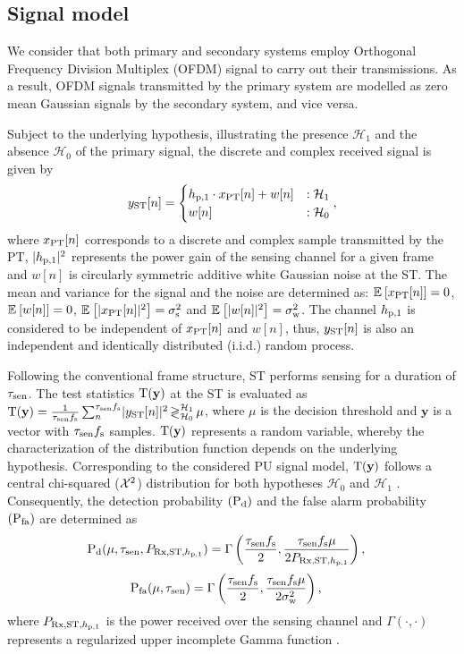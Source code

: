 
\subsection*{Signal model}
We consider that both primary and secondary systems employ Orthogonal Frequency Division Multiplex (OFDM) signal to carry out their transmissions. As a result, OFDM signals transmitted by the primary system are modelled as zero mean Gaussian signals by the secondary system, and vice versa. 

Subject to the underlying hypothesis, illustrating the presence $\mathcal H_1$ and the absence $\mathcal H_0$ of the primary signal, the discrete and complex received signal is given by 
\begin{equation}
y_{\text{ST}}[n] = 
\begin{cases}
h_{\text{p,1}} \cdot x_{\text{PT}}[n] + w[n] & : \mathcal{H}_1 \\
w[n] & :\mathcal{H}_0
\end{cases},
\label{eq:sig_mod_st}
\end{equation}
where $x_{\text{PT}}[n]$ corresponds to a discrete and complex sample transmitted by the PT, $|h_{\text{p,1}}|^2$ represents the power gain of the sensing channel for a given frame and $w[n]$ is circularly symmetric additive white Gaussian noise at the ST. 
The mean and variance for the signal and the noise are determined as: ${\mathbb E}_{}\left[ x_{\text{PT}}[n] \right] = 0$, ${\mathbb E}_{}\left[ w[n] \right] = 0$, ${\mathbb E}_{}\left[ |x_{\text{PT}}[n]|^2 \right] = \sigma^2_{\text{s}}$ and ${\mathbb E}_{}\left[ |w[n]|^2 \right] = \sigma^2_{\text{w}}$. 
The channel $h_{\text{p,1}}$ is considered to be independent of $x_{\text{PT}}[n]$ and $w[n]$, thus, $y_{\text{ST}}[n]$ is also an independent and identically distributed (i.i.d.) random process.

Following the conventional frame structure, ST performs sensing for a duration of $\tau_{\text{sen}}$. The test statistics $\operatorname*{\text{T}(\textbf{y})}$ at the ST is evaluated as $\operatorname*{\text{T}(\textbf{y})} = {\frac{1}{{\tau_{\text{sen}} f_{\text{s}}}}\sum_n^{\tau_{\text{sen}} f_{\text{s}}}} { |y_{\text{ST}}[n]|^2} \mathop{\gtrless}_{\mathcal{H}_0}^{\mathcal{H}_1} \mu$, where $\mu$ is the decision threshold and $\textbf{y}$ is a vector with $\tau_{\text{sen}} f_{\text{s}}$ samples. $\operatorname*{\text{T}(\textbf{y})}$ represents a random variable, whereby the characterization of the distribution function depends on the underlying hypothesis. Corresponding to the considered PU signal model, $\operatorname*{\text{T}(\textbf{y})}$ follows a central chi-squared ($\cchi2$) distribution for both hypotheses $\mathcal H_0$ and $\mathcal H_1$ \cite{Kay}.
Consequently, the detection probability $(\text{P}_{\text{d}})$ and the false alarm probability $(\text{P}_{\text{fa}})$ are determined as \cite{Tan08}
\begin{align}
\text{P}_{\text{d}}(\mu, \tau_{\text{sen}}, P_{\text{Rx,ST,$h_{\text{p,1}}$}}) &= \Gamma\left( \frac{\tau_{\text{sen}} f_{\text{s}}}{2}, \frac{\tau_{\text{sen}} f_{\text{s}} \mu}{2 P_{\text{Rx,ST,$h_{\text{p,1}}$}}} \right),  \label{eq:pd} 
\end{align}
\begin{align}
\text{P}_{\text{fa}}(\mu, \tau_{\text{sen}}) &= \Gamma\left( \frac{\tau_{\text{sen}} f_{\text{s}}}{2}, \frac{\tau_{\text{sen}} f_{\text{s}} \mu}{2 \sigma^2_{\text{w}}} \right),  \label{eq:pfa} 
\end{align}
where $P_{\text{Rx,ST,$h_{\text{p,1}}$}}$ is the power received over the sensing channel and $\Gamma(\cdot, \cdot)$ represents a regularized upper incomplete Gamma function \cite{grad}.

